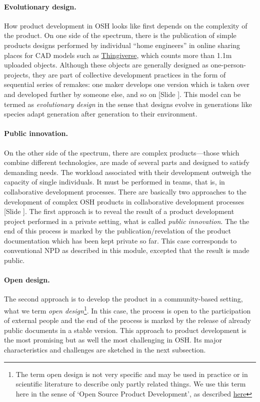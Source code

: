 \documentclass{article}
\newcounter{slide}
\begin{document}
\paragraph{Evolutionary design.}How product development in OSH looks like first depends on the complexity of the product. On one side of the spectrum, there is the publication of simple products designs performed by individual ``home engineers'' in online sharing places for CAD models such as \href{http://thingiverse.com/}{Thingiverse}, which counts more than 1.1m uploaded objects. Although these objects are generally designed as one-person-projects, they are part of collective development practices in the form of sequential series of remakes: one maker develops one version which is taken over and developed further by someone else, and so on \cite{kyriakouKnowledgeReuseCustomization2017}{\color{blue}[Slide ]}. This model can be termed as \emph{evolutionary design} in the sense that designs evolve in generations like species adapt generation after generation to their environment. 

\paragraph{Public innovation.}On the other side of the spectrum, there are complex products---those which combine different technologies, are made of several parts and designed to satisfy demanding needs. The workload associated with their development outweigh the capacity of single individuals. It must be performed in teams, that is, in collaborative development processes. There are basically two approaches to the development of complex OSH products in collaborative development processes {\color{blue}[Slide ]}. The first approach is to reveal the result of a product development project performed in a private setting, what is called \emph{public innovation}. The the end of this process is marked by the publication/revelation of the product documentation which has been kept private so far. This case corresponds to conventional NPD as described in this module, excepted that the result is made public. 

\paragraph{Open design.}The second approach is to develop the product in a community-based setting, what we term \emph{open design}\footnote{The term open design is not very specific and may be used in practice or in scientific literature to describe only partly related things. We use this term here in the sense of `Open Source Product Development', as described \href{https://opensourcedesign.cc/wiki/index.php/Open_Source_Product_Development}{here}}. In this case, the process is open to the participation of external people and the end of the process is marked by the release of already public documents in a stable version. This approach to product development is the most promising but as well the most challenging in OSH. Its major characteristics and challenges are sketched in the next subsection.
\end{document}
